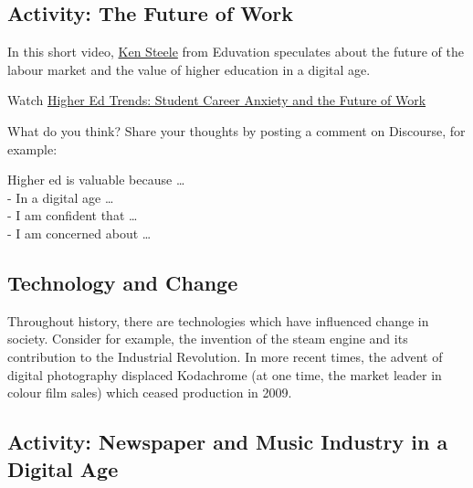 \documentclass[
]{book}
\theoremstyle{definition}
\theoremstyle{definition}
\theoremstyle{definition}
\theoremstyle{definition}
\theoremstyle{remark}
\begin{document}
\hypertarget{activity-the-future-of-work}{%
\subsection*{Activity: The Future of Work}\label{activity-the-future-of-work}}

\begin{reflect}
In this short video, \href{http://eduvation.ca/bio/}{Ken Steele} from Eduvation speculates about the future of the labour market and the value of higher education in a digital age.

Watch \href{https://www.youtube.com/watch?v=iY4UhfQefdU}{Higher Ed Trends: Student Career Anxiety and the Future of Work}

What do you think? Share your thoughts by posting a comment on Discourse, for example:

Higher ed is valuable because \ldots{}\\
- In a digital age \ldots{}\\
- I am confident that \ldots{}\\
- I am concerned about \ldots{}
\end{reflect}

\hypertarget{technology-and-change}{%
\subsection*{Technology and Change}\label{technology-and-change}}

Throughout history, there are technologies which have influenced change in society. Consider for example, the invention of the steam engine and its contribution to the Industrial Revolution. In more recent times, the advent of digital photography displaced Kodachrome (at one time, the market leader in colour film sales) which ceased production in 2009.

\hypertarget{activity-newspaper-and-music-industry-in-a-digital-age}{%
\subsection*{Activity: Newspaper and Music Industry in a Digital Age}\label{activity-newspaper-and-music-industry-in-a-digital-age}}
\end{document}
